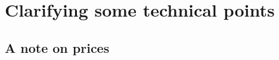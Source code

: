 \documentclass[a4paper,12pt]{article}
\begin{document}




\newpage




\newpage

\appendix


\section{Clarifying some technical points \label{app:technical_points}}


\subsection{A note on prices}
\end{document}
